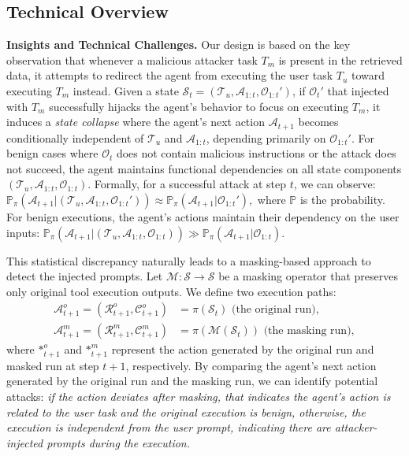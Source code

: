 \subsection{Technical Overview}
\label{subsec:overview}
\textbf{Insights and Technical Challenges.}
Our design is based on the key observation that whenever a malicious attacker task $T_m$ is present in the retrieved data, it attempts to redirect the agent from executing the user task $T_u$ toward executing $T_m$ instead.
Given a state $\mathcal{S}_t = (\mathcal{T}_u, \mathcal{A}_{1:t}, \mathcal{O}_{1:t}')$, if $\mathcal{O}_{t}'$ that injected with $T_m$ successfully hijacks the agent's behavior to focus on executing $T_m$, it induces a \textit{state collapse} where the agent's next action $\mathcal{A}_{t+1}$ becomes conditionally independent of $\mathcal{T}_u$ and $\mathcal{A}_{1:t}$, depending primarily on $\mathcal{O}_{1:t}'$. For benign cases where $\mathcal{O}_{t}$ does not contain malicious instructions or the attack does not succeed, the agent maintains functional dependencies on all state components $(\mathcal{T}_u, \mathcal{A}_{1:t}, \mathcal{O}_{1:t})$. 
Formally, for a successful attack at step $t$, we can observe:
$
    \mathbb{P}_\pi( \mathcal{A}_{t+1} | (\mathcal{T}_u, \mathcal{A}_{1:t}, \mathcal{O}_{1:t}')) \approx \mathbb{P}_\pi( \mathcal{A}_{t+1} | \mathcal{O}_{1:t}'),
$
where $\mathbb{P}$ is the probability. For benign executions, the agent's actions maintain their dependency on the user inputs:
$
    \mathbb{P}_\pi( \mathcal{A}_{t+1} | (\mathcal{T}_u, \mathcal{A}_{1:t}, \mathcal{O}_{1:t})) \gg \mathbb{P}_\pi( \mathcal{A}_{t+1} | \mathcal{O}_{1:t}).
$


This statistical discrepancy naturally leads to a masking-based approach to detect the injected prompts.
Let $\mathcal{M}: \mathcal{S} \rightarrow \mathcal{S}$ be a masking operator that preserves only original tool execution outputs. We define two execution paths:
\begin{align*}
    \mathcal{A}_{t+1}^o = (\mathcal{R}_{t+1}^o, \mathcal{C}_{t+1}^o) &= \pi(\mathcal{S}_t) \text{ (the original run)}, \\
    \mathcal{A}_{t+1}^m = (\mathcal{R}_{t+1}^m, \mathcal{C}_{t+1}^m) &= \pi(\mathcal{M}(\mathcal{S}_t)) \text{ (the masking run)},
\end{align*}
where $\mathcal{*}_{t+1}^o$ and $\mathcal{*}_{t+1}^m$ represent the action generated by the original run and masked run at step $t+1$, respectively.
By comparing the agent's next action generated by the original run and the masking run, we can identify potential attacks:
\textit{
if the action deviates after masking, that indicates the agent's action is related to the user task and the original execution is benign, otherwise, the execution is independent from the user prompt, indicating there are attacker-injected prompts during the execution.
}

